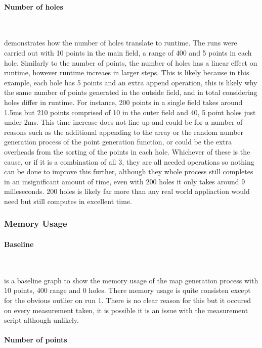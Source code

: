 \documentclass[final]{cmpreport_02}
\begin{document}
\paragraph{Number of holes} \

 demonstrates how the number of holes translate to runtime.
The runs were carried out with 10 points in the main field, a range of 400 and 5 points in each hole.
Similarly to the number of points, the number of holes has a linear effect on runtime, however runtime increaes in larger steps.
This is likely because in this example, each hole has 5 points and an extra append operation, this is likely why the same number of points generated in the outside field, and in total considering holes differ in runtime.
For instance, 200 points in a single field takes around 1.5ms but 210 points comprised of 10 in the outer field and 40, 5 point holes just under 2ms.
This time increase does not line up and could be for a number of reasons such as the additional appending to the array or the random number generation process of the point generation function, or could be the extra overheads from the sorting of the points in each hole.
Whichever of these is the cause, or if it is a combination of all 3, they are all needed operations so nothing can be done to improve this further, although they whole process still completes in an insignificant amount of time, even with 200 holes it only takes around 9 milleseconds.
200 holes is likely far more than any real world appliaction would need but still computes in excellent time.


\subsubsection{Memory Usage}

\paragraph{Baseline} \

 is a baseline graph to show the memory usage of the map generation process with 10 points, 400 range and 0 holes.
There memory usage is quite consisten except for the obvious outlier on run 1.
There is no clear reason for this but it occured on every measurement taken, it is possible it is an issue with the measurement script although unlikely.


\paragraph{Number of points} \
\end{document}
